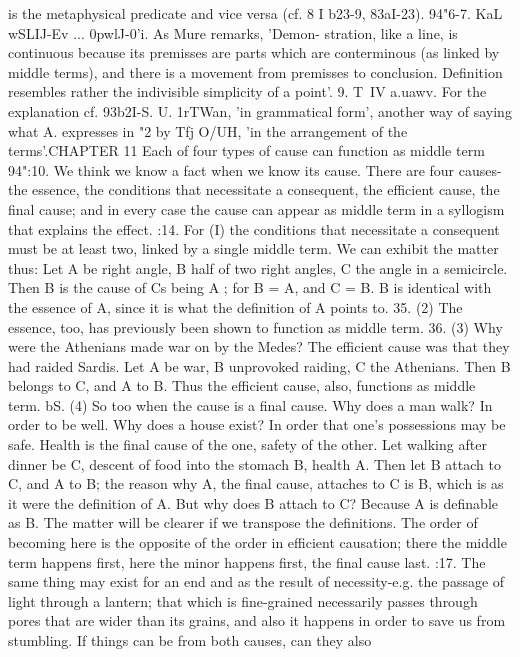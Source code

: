 {{{{{{{{{{{{{{{{{{{{{{{{{{{{{{{{{{{{{{{{{{{{{{{{{{{{{{{{{is the metaphysical predicate and vice versa (cf. 8 I b23-9, 83aI-23).
94"6-7. KaL wSLIJ-Ev ... 0pwlJ-0'i. As Mure remarks, 'Demon-
stration, like a line, is continuous because its premisses are parts
which are conterminous (as linked by middle terms), and there
is a movement from premisses to conclusion. Definition resembles
rather the indivisible simplicity of a point'.
9. T~IV a.uawv. For the explanation cf. 93b2I-S.
U. 1rTWan, 'in grammatical form', another way of saying what
A. expresses in "2 by Tfj O/UH, 'in the arrangement of the terms'.CHAPTER 11
Each of four types of cause can function as middle term
94":10. We think we know a fact when we know its cause.
There are four causes-the essence, the conditions that necessitate
a consequent, the efficient cause, the final cause; and in every
case the cause can appear as middle term in a syllogism that
explains the effect.
:14. For (I) the conditions that necessitate a consequent must
be at least two, linked by a single middle term. We can exhibit
the matter thus: Let A be right angle, B half of two right angles,
C the angle in a semicircle. Then B is the cause of Cs being A ;
for B = A, and C = B. B is identical with the essence of A,
since it is what the definition of A points to.
35. (2) The essence, too, has previously been shown to function
as middle term.
36. (3) Why were the Athenians made war on by the Medes?
The efficient cause was that they had raided Sardis. Let A be
war, B unprovoked raiding, C the Athenians. Then B belongs
to C, and A to B. Thus the efficient cause, also, functions as
middle term.
bS. (4) So too when the cause is a final cause. Why does a man
walk? In order to be well. Why does a house exist? In order
that one's possessions may be safe. Health is the final cause of
the one, safety of the other. Let walking after dinner be C,
descent of food into the stomach B, health A. Then let B attach
to C, and A to B; the reason why A, the final cause, attaches to
C is B, which is as it were the definition of A. But why does B
attach to C? Because A is definable as B. The matter will be
clearer if we transpose the definitions. The order of becoming here
is the opposite of the order in efficient causation; there the middle
term happens first, here the minor happens first, the final cause
last.
:17. The same thing may exist for an end and as the result of
necessity-e.g. the passage of light through a lantern; that which
is fine-grained necessarily passes through pores that are wider
than its grains, and also it happens in order to save us from
stumbling. If things can be from both causes, can they also
}}}}}}}}}}}}}}}}}}}}}}}}}}}}}}}}}}}}}}}}}}}}}}}}}}}}}}}}}
